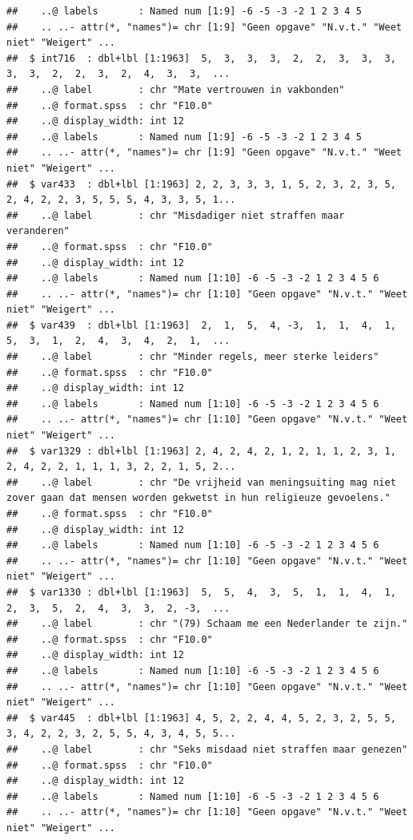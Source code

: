 \documentclass[
]{book}
\begin{document}
\begin{verbatim}
##    ..@ labels       : Named num [1:9] -6 -5 -3 -2 1 2 3 4 5
##    .. ..- attr(*, "names")= chr [1:9] "Geen opgave" "N.v.t." "Weet niet" "Weigert" ...
##  $ int716  : dbl+lbl [1:1963]  5,  3,  3,  3,  2,  2,  3,  3,  3,  3,  3,  2,  2,  3,  2,  4,  3,  3,  ...
##    ..@ label        : chr "Mate vertrouwen in vakbonden"
##    ..@ format.spss  : chr "F10.0"
##    ..@ display_width: int 12
##    ..@ labels       : Named num [1:9] -6 -5 -3 -2 1 2 3 4 5
##    .. ..- attr(*, "names")= chr [1:9] "Geen opgave" "N.v.t." "Weet niet" "Weigert" ...
##  $ var433  : dbl+lbl [1:1963] 2, 2, 3, 3, 3, 1, 5, 2, 3, 2, 3, 5, 2, 4, 2, 2, 3, 5, 5, 5, 4, 3, 3, 5, 1...
##    ..@ label        : chr "Misdadiger niet straffen maar veranderen"
##    ..@ format.spss  : chr "F10.0"
##    ..@ display_width: int 12
##    ..@ labels       : Named num [1:10] -6 -5 -3 -2 1 2 3 4 5 6
##    .. ..- attr(*, "names")= chr [1:10] "Geen opgave" "N.v.t." "Weet niet" "Weigert" ...
##  $ var439  : dbl+lbl [1:1963]  2,  1,  5,  4, -3,  1,  1,  4,  1,  5,  3,  1,  2,  4,  3,  4,  2,  1,  ...
##    ..@ label        : chr "Minder regels, meer sterke leiders"
##    ..@ format.spss  : chr "F10.0"
##    ..@ display_width: int 12
##    ..@ labels       : Named num [1:10] -6 -5 -3 -2 1 2 3 4 5 6
##    .. ..- attr(*, "names")= chr [1:10] "Geen opgave" "N.v.t." "Weet niet" "Weigert" ...
##  $ var1329 : dbl+lbl [1:1963] 2, 4, 2, 4, 2, 1, 2, 1, 1, 2, 3, 1, 2, 4, 2, 2, 1, 1, 1, 3, 2, 2, 1, 5, 2...
##    ..@ label        : chr "De vrijheid van meningsuiting mag niet zover gaan dat mensen worden gekwetst in hun religieuze gevoelens."
##    ..@ format.spss  : chr "F10.0"
##    ..@ display_width: int 12
##    ..@ labels       : Named num [1:10] -6 -5 -3 -2 1 2 3 4 5 6
##    .. ..- attr(*, "names")= chr [1:10] "Geen opgave" "N.v.t." "Weet niet" "Weigert" ...
##  $ var1330 : dbl+lbl [1:1963]  5,  5,  4,  3,  5,  1,  1,  4,  1,  2,  3,  5,  2,  4,  3,  3,  2, -3,  ...
##    ..@ label        : chr "(79) Schaam me een Nederlander te zijn."
##    ..@ format.spss  : chr "F10.0"
##    ..@ display_width: int 12
##    ..@ labels       : Named num [1:10] -6 -5 -3 -2 1 2 3 4 5 6
##    .. ..- attr(*, "names")= chr [1:10] "Geen opgave" "N.v.t." "Weet niet" "Weigert" ...
##  $ var445  : dbl+lbl [1:1963] 4, 5, 2, 2, 4, 4, 5, 2, 3, 2, 5, 5, 3, 4, 2, 2, 3, 2, 5, 5, 4, 3, 4, 5, 5...
##    ..@ label        : chr "Seks misdaad niet straffen maar genezen"
##    ..@ format.spss  : chr "F10.0"
##    ..@ display_width: int 12
##    ..@ labels       : Named num [1:10] -6 -5 -3 -2 1 2 3 4 5 6
##    .. ..- attr(*, "names")= chr [1:10] "Geen opgave" "N.v.t." "Weet niet" "Weigert" ...

\end{verbatim}
\end{document}
